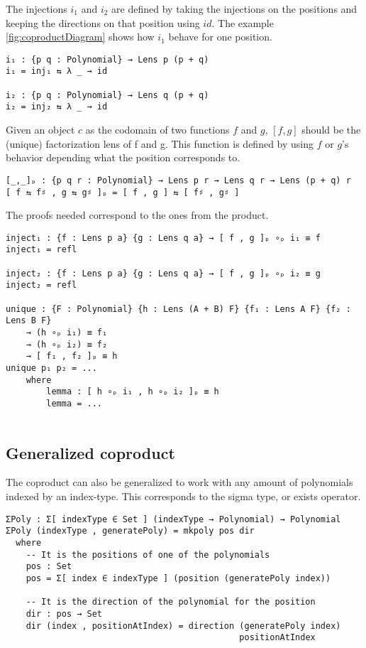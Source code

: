 The injections $i_1$ and $i_2$ are defined by taking the injections on the positions and keeping the directions on that position using $id$. The example \ref{fig:coproductDiagram} shows how $i_1$ behave for one position. 

\begin{verbatim}
i₁ : {p q : Polynomial} → Lens p (p + q)
i₁ = inj₁ ⇆ λ _ → id

i₂ : {p q : Polynomial} → Lens q (p + q)
i₂ = inj₂ ⇆ λ _ → id
\end{verbatim}


Given an object $c$ as the codomain of two functions $f$ and $g$, $[f,g]$ should be the (unique) factorization lens of f and g. This function is defined by using $f$ or $g$'s behavior depending what the position corresponds to.


\begin{verbatim}
[_,_]ₚ : {p q r : Polynomial} → Lens p r → Lens q r → Lens (p + q) r
[ f ⇆ f♯ , g ⇆ g♯ ]ₚ = [ f , g ] ⇆ [ f♯ , g♯ ]
\end{verbatim}

The proofs needed correspond to the ones from the product. 
\begin{verbatim}
inject₁ : {f : Lens p a} {g : Lens q a} → [ f , g ]ₚ ∘ₚ i₁ ≡ f
inject₁ = refl

inject₂ : {f : Lens p a} {g : Lens q a} → [ f , g ]ₚ ∘ₚ i₂ ≡ g
inject₂ = refl

unique : {F : Polynomial} {h : Lens (A + B) F} {f₁ : Lens A F} {f₂ : Lens B F} 
    → (h ∘ₚ i₁) ≡ f₁
    → (h ∘ₚ i₂) ≡ f₂
    → [ f₁ , f₂ ]ₚ ≡ h
unique p₁ p₂ = ...
    where
        lemma : [ h ∘ₚ i₁ , h ∘ₚ i₂ ]ₚ ≡ h
        lemma = ...
        
\end{verbatim}


\subsection{Generalized coproduct}
The coproduct can also be generalized to work with any amount of polynomials indexed by an index-type. This corresponds to the sigma type, or exists operator.
\begin{verbatim}
ΣPoly : Σ[ indexType ∈ Set ] (indexType → Polynomial) → Polynomial
ΣPoly (indexType , generatePoly) = mkpoly pos dir
  where
    -- It is the positions of one of the polynomials
    pos : Set 
    pos = Σ[ index ∈ indexType ] (position (generatePoly index))

    -- It is the direction of the polynomial for the position
    dir : pos → Set
    dir (index , positionAtIndex) = direction (generatePoly index)
                                              positionAtIndex
\end{verbatim}

